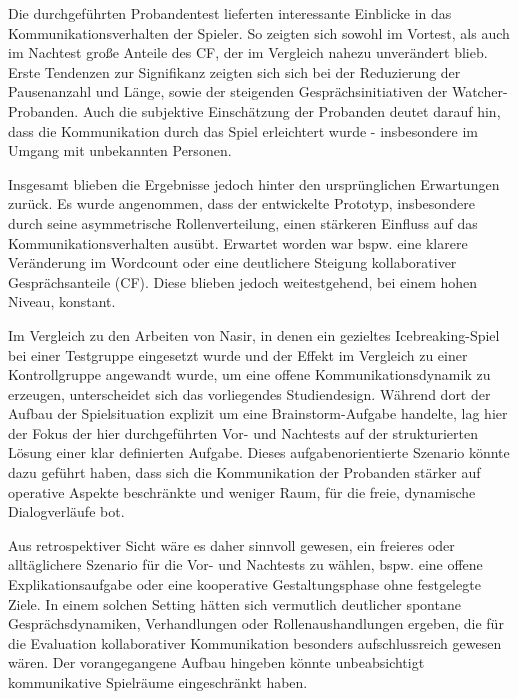 Die durchgeführten Probandentest lieferten interessante Einblicke in das Kommunikationsverhalten der Spieler. So zeigten sich sowohl im Vortest, als auch im Nachtest große Anteile des \ac{CF}, der im Vergleich nahezu unverändert blieb. Erste Tendenzen zur Signifikanz zeigten sich sich bei der Reduzierung der Pausenanzahl und Länge, sowie der steigenden Gesprächsinitiativen der Watcher-Probanden. Auch die subjektive Einschätzung der Probanden deutet darauf hin, dass die Kommunikation durch das Spiel erleichtert wurde - insbesondere im Umgang mit unbekannten Personen. 

Insgesamt blieben die Ergebnisse jedoch hinter den ursprünglichen Erwartungen zurück. Es wurde angenommen, dass der entwickelte Prototyp, insbesondere durch seine asymmetrische Rollenverteilung, einen stärkeren Einfluss auf das Kommunikationsverhalten ausübt. Erwartet worden war bspw. eine klarere Veränderung im Wordcount oder eine deutlichere Steigung kollaborativer Gesprächsanteile (\ac{CF}). Diese blieben jedoch weitestgehend, bei einem hohen Niveau, konstant.

Im Vergleich zu den Arbeiten von Nasir, in denen ein gezieltes Icebreaking-Spiel bei einer Testgruppe eingesetzt wurde und der Effekt im Vergleich zu einer Kontrollgruppe angewandt wurde, um eine offene Kommunikationsdynamik zu erzeugen, unterscheidet sich das vorliegendes Studiendesign. Während dort der Aufbau der Spielsituation explizit um eine Brainstorm-Aufgabe handelte, lag hier der Fokus der hier durchgeführten Vor- und Nachtests auf der strukturierten Lösung einer klar definierten Aufgabe. Dieses aufgabenorientierte Szenario könnte dazu geführt haben, dass sich die Kommunikation der Probanden stärker auf operative Aspekte beschränkte und weniger Raum, für die freie, dynamische Dialogverläufe bot. 

Aus retrospektiver Sicht wäre es daher sinnvoll gewesen, ein freieres oder alltäglichere Szenario für die Vor- und Nachtests zu wählen, bspw. eine offene Explikationsaufgabe oder eine kooperative Gestaltungsphase ohne festgelegte Ziele. In einem solchen Setting hätten sich vermutlich deutlicher spontane Gesprächsdynamiken, Verhandlungen oder Rollenaushandlungen ergeben, die für die Evaluation kollaborativer Kommunikation besonders aufschlussreich gewesen wären. Der vorangegangene Aufbau hingeben könnte unbeabsichtigt kommunikative Spielräume eingeschränkt haben.